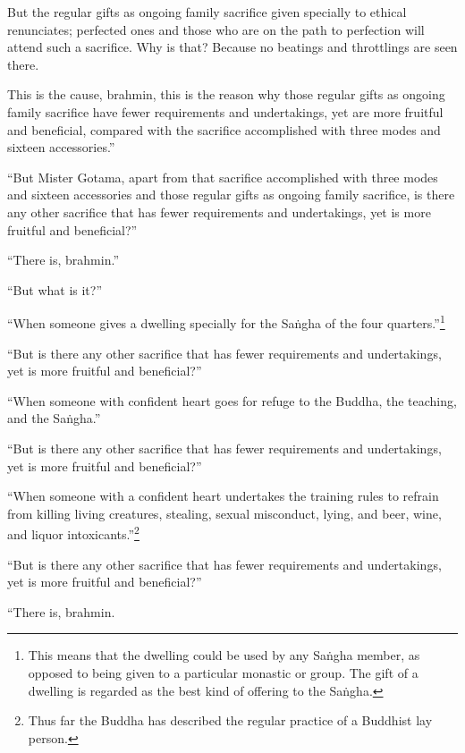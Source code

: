 \documentclass[12pt,openany]{book}%
\begin{document}
But the regular gifts as ongoing family sacrifice given specially to ethical renunciates; perfected ones and those who are on the path to perfection will attend such a sacrifice. Why is that? Because no beatings and throttlings are seen there. 

This is the cause, brahmin, this is the reason why those regular gifts as ongoing family sacrifice have fewer requirements and undertakings, yet are more fruitful and beneficial, compared with the sacrifice accomplished with three modes and sixteen accessories.” 

“But Mister Gotama, apart from that sacrifice accomplished with three modes and sixteen accessories and those regular gifts as ongoing family sacrifice, is there any other sacrifice that has fewer requirements and undertakings, yet is more fruitful and beneficial?” 

“There is, brahmin.” 

“But what is it?” 

“When someone gives a dwelling specially for the \textsanskrit{Saṅgha} of the four quarters.”\footnote{This means that the dwelling could be used by any \textsanskrit{Saṅgha} member, as opposed to being given to a particular monastic or group. The gift of a dwelling is regarded as the best kind of offering to the \textsanskrit{Saṅgha}. } 

“But is there any other sacrifice that has fewer requirements and undertakings, yet is more fruitful and beneficial?” 

“When someone with confident heart goes for refuge to the Buddha, the teaching, and the \textsanskrit{Saṅgha}.” 

“But is there any other sacrifice that has fewer requirements and undertakings, yet is more fruitful and beneficial?” 

“When someone with a confident heart undertakes the training rules to refrain from killing living creatures, stealing, sexual misconduct, lying, and beer, wine, and liquor intoxicants.”\footnote{Thus far the Buddha has described the regular practice of a Buddhist lay person. } 

“But is there any other sacrifice that has fewer requirements and undertakings, yet is more fruitful and beneficial?” 

“There is, brahmin. 
\end{document}
